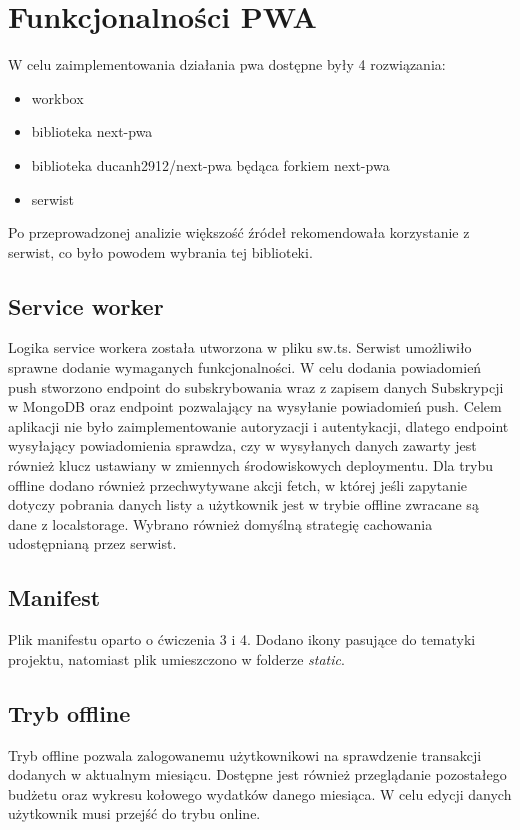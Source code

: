 \documentclass[11pt,titlepage]{article}
\begin{document}
\newpage

\section{Funkcjonalności PWA}
W celu zaimplementowania działania pwa dostępne były 4 rozwiązania:
\begin{itemize}
  \item workbox
  \item biblioteka next-pwa
  \item biblioteka ducanh2912/next-pwa będąca forkiem next-pwa
  \item serwist
\end{itemize}
Po przeprowadzonej analizie większość źródeł rekomendowała korzystanie z serwist, co było powodem wybrania tej biblioteki. 

\subsection{Service worker}
Logika service workera została utworzona w pliku sw.ts. Serwist umożliwiło sprawne dodanie wymaganych funkcjonalności. W celu dodania powiadomień push stworzono endpoint do subskrybowania wraz z zapisem danych Subskrypcji w MongoDB oraz endpoint pozwalający na wysyłanie powiadomień push. Celem aplikacji nie było zaimplementowanie autoryzacji i autentykacji, dlatego endpoint wysyłający powiadomienia sprawdza, czy w wysyłanych danych zawarty jest również klucz ustawiany w zmiennych środowiskowych deploymentu. Dla trybu offline dodano również przechwytywane akcji fetch, w której jeśli zapytanie dotyczy pobrania danych listy a użytkownik jest w trybie offline zwracane są dane z localstorage. Wybrano również domyślną strategię cachowania udostępnianą przez serwist.

\subsection{Manifest}
Plik manifestu oparto o ćwiczenia 3 i 4. Dodano ikony pasujące do tematyki projektu, natomiast plik umieszczono w folderze \textit{static}.

\subsection{Tryb offline}
Tryb offline pozwala zalogowanemu użytkownikowi na sprawdzenie transakcji dodanych w aktualnym miesiącu. Dostępne jest również przeglądanie pozostałego budżetu oraz wykresu kołowego wydatków danego miesiąca. W celu edycji danych użytkownik musi przejść do trybu online.
\end{document}
